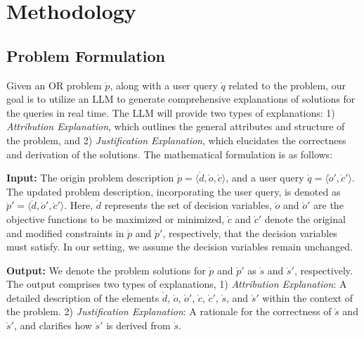\section{Methodology}

\subsection{Problem Formulation}

Given an OR problem $\mathring{p}$, along with a user query $\mathring{q}$ related to the problem, our goal is to utilize an LLM to generate comprehensive explanations of solutions for the queries in real time. The LLM will provide two types of explanations: 1) \textit{Attribution Explanation}, which outlines the general attributes and structure of the problem, and 2) \textit{Justification Explanation}, which elucidates the correctness and derivation of the solutions. The mathematical formulation is as follows:

\textbf{Input:} The origin problem description $\mathring{p} = \langle \mathring{d}, \mathring{o}, \mathring{c}\rangle$, and a user query $\mathring{q} = \langle \mathring{o}', \mathring{c}' \rangle$. The updated problem description, incorporating the user query, is denoted as $\mathring{p}' = \langle \mathring{d}, \mathring{o}', \mathring{c}'\rangle$. Here, $\mathring{d}$ represents the set of decision variables, $\mathring{o}$ and $\mathring{o}'$ are the objective functions to be maximized or minimized, $\mathring{c}$ and $\mathring{c}'$ denote the original and modified constraints in $\mathring{p}$ and $\mathring{p}'$, respectively, that the decision variables must satisfy. In our setting, we assume the decision variables remain unchanged.

\textbf{Output:} We denote the problem solutions for $\mathring{p}$ and $\mathring{p}'$ as $\mathring{s}$ and $\mathring{s}'$, respectively. The output comprises two types of explanations, 1) \textit{Attribution Explanation}: A detailed description of the elements $\mathring{d}$, $\mathring{o}$, $\mathring{o}'$, $\mathring{c}$, $\mathring{c}'$, $\mathring{s}$, and $\mathring{s}'$ within the context of the problem. 2) \textit{Justification Explanation}: A rationale for the correctness of $\mathring{s}$ and $\mathring{s}'$, and clarifies how $\mathring{s}'$ is derived from $\mathring{s}$.

